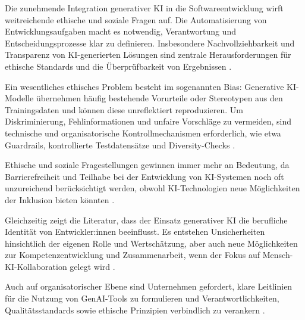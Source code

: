 
Die zunehmende Integration generativer KI in die Softwareentwicklung wirft
weitreichende ethische und soziale Fragen auf. Die Automatisierung von
Entwicklungsaufgaben macht es notwendig, Verantwortung und
Entscheidungsprozesse klar zu definieren. Insbesondere Nachvollziehbarkeit und
Transparenz von KI-generierten Lösungen sind zentrale Herausforderungen für
ethische Standards und die Überprüfbarkeit von Ergebnissen
\cite{weisz_design_2024}.

Ein wesentliches ethisches Problem besteht im sogenannten Bias: Generative
KI-Modelle übernehmen häufig bestehende Vorurteile oder Stereotypen aus den
Trainingsdaten und können diese unreflektiert reproduzieren. Um
Diskriminierung, Fehlinformationen und unfaire Vorschläge zu vermeiden, sind
technische und organisatorische Kontrollmechanismen erforderlich, wie etwa
Guardrails, kontrollierte Testdatensätze und Diversity-Checks
\cite{weisz_design_2024, schmitt_generative_2024}.

Ethische und soziale Fragestellungen gewinnen immer mehr an Bedeutung, da
Barrierefreiheit und Teilhabe bei der Entwicklung von KI-Systemen noch oft
unzureichend berücksichtigt werden, obwohl KI-Technologien neue Möglichkeiten
der Inklusion bieten könnten \cite{flores-saviaga_impact_2025}.

Gleichzeitig zeigt die Literatur, dass der Einsatz generativer KI die
berufliche Identität von Entwickler:innen beeinflusst. Es entstehen
Unsicherheiten hinsichtlich der eigenen Rolle und Wertschätzung, aber auch neue
Möglichkeiten zur Kompetenzentwicklung und Zusammenarbeit, wenn der Fokus auf
Mensch-KI-Kollaboration gelegt wird \cite{schmitt_generative_2024}.

Auch auf organisatorischer Ebene sind Unternehmen gefordert, klare Leitlinien
für die Nutzung von GenAI-Tools zu formulieren und Verantwortlichkeiten,
Qualitätsstandards sowie ethische Prinzipien verbindlich zu verankern
\cite{nguyen-duc_generative_2023}.
